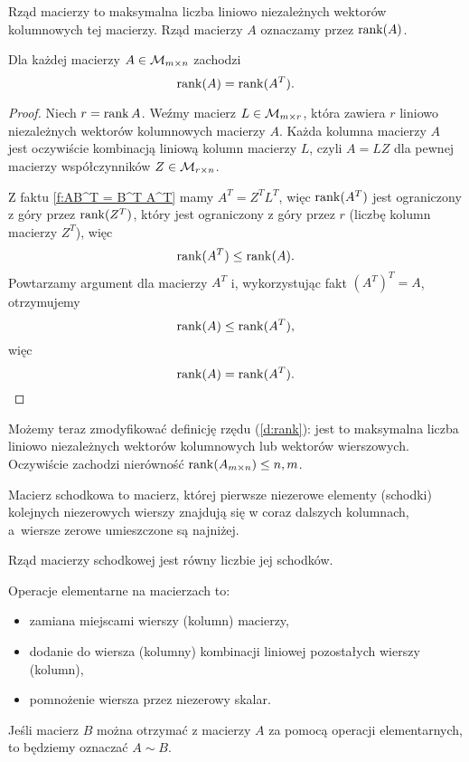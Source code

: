 \begin{definition}
    \label{d:rank}
    Rząd macierzy to maksymalna liczba liniowo niezależnych wektorów kolumnowych tej macierzy. Rząd macierzy $A$ oznaczamy przez $\operatorname{rank} (A)$.
\end{definition}

\begin{theorem}
    Dla każdej macierzy $A \in \mathcal M_{m\times n}$ zachodzi
    \[ \operatorname{rank}(A) = \operatorname{rank}(A^T). \]
\end{theorem}
\begin{proof}
    Niech $r = \operatorname{rank} A$. Weźmy macierz $L \in \mathcal M_{m\times r}$, która zawiera $r$ liniowo niezależnych wektorów kolumnowych macierzy $A$. Każda kolumna macierzy $A$ jest oczywiście kombinacją liniową kolumn macierzy $L$, czyli $A = LZ$ dla pewnej macierzy współczynników $Z \in \mathcal M_{r\times n}$.

    Z faktu \ref{f:AB^T = B^T A^T} mamy $A^T = Z^TL^T$, więc $\operatorname{rank} (A^T)$ jest ograniczony z góry przez $\operatorname{rank}(Z^T)$, który jest ograniczony z góry przez $r$ (liczbę kolumn macierzy $Z^T$), więc
    \[ \operatorname{rank}(A^T) \leq \operatorname{rank}(A). \]
    Powtarzamy argument dla macierzy $A^T$ i, wykorzystując fakt $(A^T)^T = A$, otrzymujemy
    \[ \operatorname{rank}(A) \leq \operatorname{rank}(A^T), \]
    więc
    \[ \operatorname{rank}(A) = \operatorname{rank}(A^T). \]
\end{proof}

Możemy teraz zmodyfikować definicję rzędu (\ref{d:rank}): jest to maksymalna liczba liniowo niezależnych wektorów kolumnowych lub wektorów wierszowych. Oczywiście zachodzi nierówność $\operatorname{rank} (A_{m\times n}) \leq n, m$.

\begin{definition}
    Macierz schodkowa to macierz, której pierwsze niezerowe elementy (schodki) kolejnych niezerowych wierszy znajdują się w coraz dalszych kolumnach, a~wiersze zerowe umieszczone są najniżej.
\end{definition}

\begin{fact}
    Rząd macierzy schodkowej jest równy liczbie jej schodków.
\end{fact}

\begin{definition}
    Operacje elementarne na macierzach to:
    \begin{itemize}
        \item zamiana miejscami wierszy (kolumn) macierzy,
        \item dodanie do wiersza (kolumny) kombinacji liniowej pozostałych wierszy (kolumn),
        \item pomnożenie wiersza przez niezerowy skalar.
    \end{itemize}
    Jeśli macierz $B$ można otrzymać z macierzy $A$ za pomocą operacji elementarnych, to będziemy oznaczać $A \sim B$.
\end{definition}

